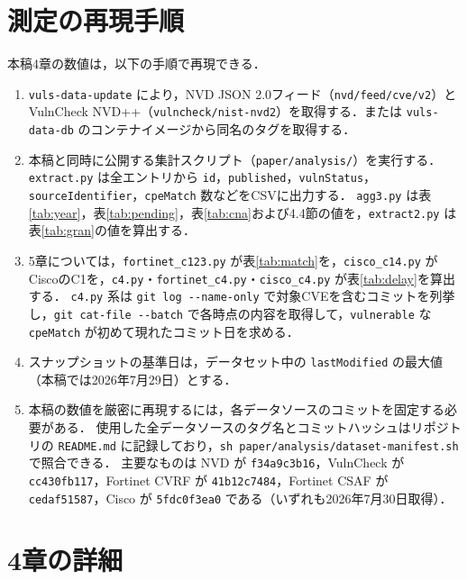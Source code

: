 \section{測定の再現手順}
\label{app:repro}

本稿4章の数値は，以下の手順で再現できる．

\begin{enumerate}
  \item \texttt{vuls-data-update}\cite{vuls-data-update} により，NVD JSON 2.0フィード（\texttt{nvd/feed/cve/v2}）とVulnCheck NVD++（\texttt{vulncheck/nist-nvd2}）を取得する．または \texttt{vuls-data-db}\cite{vuls-data-db} のコンテナイメージから同名のタグを取得する．
  \item 本稿と同時に公開する集計スクリプト（\texttt{paper/analysis/}）を実行する．
    \texttt{extract.py} は全エントリから \texttt{id}，\texttt{published}，\texttt{vulnStatus}，\texttt{sourceIdentifier}，\texttt{cpeMatch} 数などをCSVに出力する．
    \texttt{agg3.py} は表\ref{tab:year}，表\ref{tab:pending}，表\ref{tab:cna}および4.4節の値を，\texttt{extract2.py} は表\ref{tab:gran}の値を算出する．
  \item 5章については，\texttt{fortinet\_c123.py} が表\ref{tab:match}を，\texttt{cisco\_c14.py} がCiscoのC1を，\texttt{c4.py}・\texttt{fortinet\_c4.py}・\texttt{cisco\_c4.py} が表\ref{tab:delay}を算出する．
    \texttt{c4.py} 系は \texttt{git log -{}-name-only} で対象CVEを含むコミットを列挙し，\texttt{git cat-file -{}-batch} で各時点の内容を取得して，\texttt{vulnerable} な \texttt{cpeMatch} が初めて現れたコミット日を求める．
  \item スナップショットの基準日は，データセット中の \texttt{lastModified} の最大値（本稿では2026年7月29日）とする．
  \item 本稿の数値を厳密に再現するには，各データソースのコミットを固定する必要がある．
    使用した全データソースのタグ名とコミットハッシュはリポジトリの \texttt{README.md} に記録しており，\texttt{sh paper/analysis/dataset-manifest.sh} で照合できる．
    主要なものは NVD が \texttt{f34a9c3b16}，VulnCheck が \texttt{cc430fb117}，Fortinet CVRF が \texttt{41b12c7484}，Fortinet CSAF が \texttt{cedaf51587}，Cisco が \texttt{5fdc0f3ea0} である（いずれも2026年7月30日取得）．
\end{enumerate}

\section{4章の詳細}
\label{app:survey-detail}

